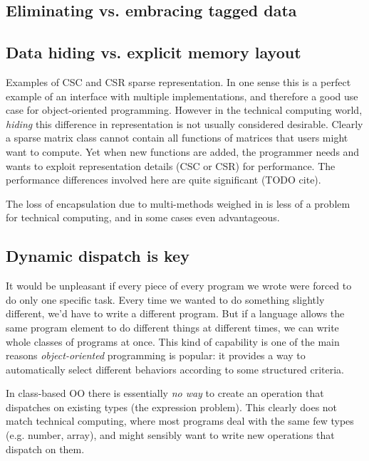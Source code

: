 \subsection{Eliminating vs. embracing tagged data}

\subsection{Data hiding vs. explicit memory layout}

Examples of CSC and CSR sparse representation.
In one sense this is a perfect example of an interface with multiple implementations,
and therefore a good use case for object-oriented programming.
However in the technical computing world, \emph{hiding} this difference in
representation is not usually considered desirable.
Clearly a sparse matrix class cannot contain all functions of matrices that users
might want to compute.
Yet when new functions are added, the programmer needs and wants to exploit
representation details (CSC or CSR) for performance.
The performance differences involved here are quite significant (TODO cite).

The loss of encapsulation due to multi-methods weighed in \cite{binarymethods}
is less of a problem for technical computing, and in some cases even
advantageous.

\subsection{Dynamic dispatch is key}

It would be unpleasant if every piece of every program we wrote were forced
to do only one specific task. Every time we wanted to do something slightly
different, we'd have to write a different program. But if a language
allows the same program element to do different things at different times,
we can write whole classes of programs at once. This kind of capability is
one of the main reasons \emph{object-oriented} programming is popular: it
provides a way to automatically select different behaviors according to
some structured criteria.

In class-based OO there is essentially \emph{no way} to create an operation
that dispatches on existing types (the expression problem). This clearly
does not match technical computing, where most programs deal with the same
few types (e.g. number, array), and might sensibly want to write new operations
that dispatch on them.


